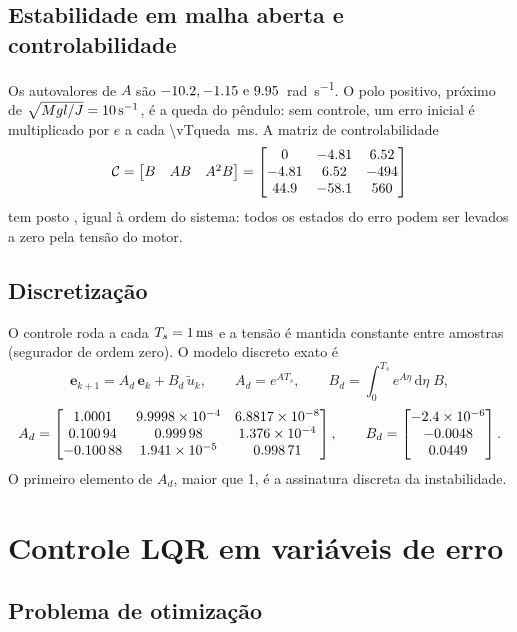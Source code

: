\documentclass[11pt,a4paper]{article}
\newcommand{\dd}{\mathrm{d}}
\newcommand{\vt}[1]{\bm{#1}}
\begin{document}
\subsection{Estabilidade em malha aberta e controlabilidade}

Os autovalores de $A$ são $\num{-10.2}, \num{-1.15} \text{ e } \num{9.95}$~\unit{\radian\per\second}. O polo positivo,
próximo de $\sqrt{Mgl/J} = \qty{10}{\per\second}$, é a queda do pêndulo: sem controle,
um erro inicial é multiplicado por $e$ a cada \qty{\vTqueda}{\milli\second}. A matriz de
controlabilidade
\begin{equation}
  \mathcal{C} = \begin{bmatrix} B & AB & A^2B \end{bmatrix} = \begin{bmatrix} \num{0} & \num{-4.81} & \num{6.52} \\ \num{-4.81} & \num{6.52} & \num{-494} \\ \num{44.9} & \num{-58.1} & \num{560} \end{bmatrix}
\end{equation}
tem posto \vPostoCtrb, igual à ordem do sistema: todos os estados do erro podem ser levados a
zero pela tensão do motor.

\subsection{Discretização}

O controle roda a cada $T_s = \qty{1}{\milli\second}$ e a tensão é mantida constante
entre amostras (segurador de ordem zero). O modelo discreto exato é
\begin{equation}
  \vt{e}_{k+1} = A_d\,\vt{e}_k + B_d\,\tilde u_k ,
  \qquad
  A_d = e^{A T_s},
  \qquad
  B_d = \int_0^{T_s} e^{A\eta}\,\dd\eta\; B ,
\end{equation}
\begin{equation}
  A_d = \begin{bmatrix} \num{1.0001} & \num{9.9998e-4} & \num{6.8817e-8} \\ \num{0.10094} & \num{0.99998} & \num{1.376e-4} \\ \num{-0.10088} & \num{1.941e-5} & \num{0.99871} \end{bmatrix} ,
  \qquad
  B_d = \begin{bmatrix} \num{-2.4e-6} \\ \num{-0.0048} \\ \num{0.0449} \end{bmatrix} .
\end{equation}
O primeiro elemento de $A_d$, maior que 1, é a assinatura discreta da instabilidade.

\section{Controle LQR em variáveis de erro}
\label{sec:lqr}

\subsection{Problema de otimização}
\end{document}
